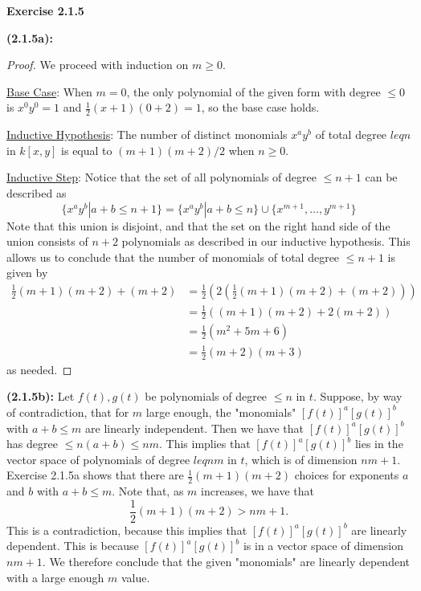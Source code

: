 \documentclass[12pt,oneside]{article}
\newenvironment{exercise}[1]{\vspace{.1in}\noindent\textbf{Exercise #1 \hspace{.05em}}}{}
\begin{document}

\begin{exercise}{2.1.5}

    \bigskip
    \textbf{(2.1.5a):}
    \begin{proof}
        We proceed with induction on $m \geq 0$. 

        \underline{Base Case}: When $m=0$, the only polynomial of the given 
        form with degree $\leq 0$ is $x^0y^0=1$ and $\frac{1}{2}(x+1)(0+2) = 1$, 
        so the base case holds.

        \underline{Inductive Hypothesis}: The number of distinct monomials $x^ay^b$ 
        of total degree $leq n$ in $k[x,y]$ is equal to $(m+1)(m+2)/2$ when $n\geq 0$.
        
        \underline{Inductive Step}: Notice that the set of all polynomials of 
        degree $\leq n+1$ can be described as 
        \[
            \{x^ay^b | a+b \leq n+1\} = \{x^ay^b | a+b \leq n\} \cup \{x^{m+1}, \ldots, y^{m+1}\}
        \]
        Note that this union is disjoint, and that the set on the right hand side 
        of the union consists of $n+2$ polynomials as described in our inductive hypothesis.
        This allows us to conclude that the number of monomials of total degree 
        $\leq n+1$ is given by
        \begin{align*}
            \frac{1}{2}(m+1)(m+2) + (m+2)   &= \frac{1}{2}(2(\frac{1}{2}(m+1)(m+2)+(m+2)))\\
                                            &= \frac{1}{2}((m+1)(m+2) + 2(m+2))\\
                                            &= \frac{1}{2}(m^2+5m+6)\\
                                            &= \frac{1}{2}(m+2)(m+3)
        \end{align*}
        as needed. 
    \end{proof}
    
    \bigskip
    \textbf{(2.1.5b):} Let $f(t), g(t)$ be polynomials of degree $\leq n$ in $t$. 
    Suppose, by way of contradiction, that for $m$ large enough, the "monomials"
    $[f(t)]^a[g(t)]^b$ with $a+b \leq m$ are linearly independent. Then we have 
    that $[f(t)]^a[g(t)]^b$ has degree $\leq n(a+b) \leq nm$. This implies that 
    $[f(t)]^a[g(t)]^b$ lies in the vector space of polynomials of degree $leq nm$ in $t$,
    which is of dimension $nm+1$. Exercise 2.1.5a shows that there are $\frac{1}{2}(m+1)(m+2)$ 
    choices for exponents $a$ and $b$ with $a+b \leq m$. Note that, as $m$ increases, 
    we have that 
    \[
        \frac{1}{2}(m+1)(m+2) > nm+1.    
    \]
    This is a contradiction, because this implies that $[f(t)]^a[g(t)]^b$ are 
    linearly dependent. This is because $[f(t)]^a[g(t)]^b$ is in a vector space 
    of dimension $nm+1$. We therefore conclude that the given "monomials" are 
    linearly dependent with a large enough $m$ value. 


\end{exercise}
\end{document}
